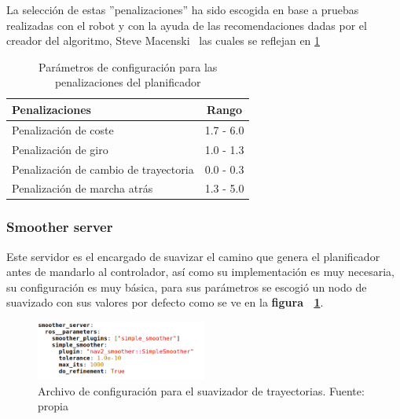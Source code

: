 La selección de estas ''penalizaciones'' ha sido escogida en base a pruebas realizadas con el robot y con la ayuda de las recomendaciones dadas 
por el creador del algoritmo, Steve Macenski~\cite{steve_mc} las cuales se reflejan en \ref{tab:parametros_planificador_steve}

\begin{table}[h!]
    \centering
    \caption{Parámetros de configuración para las penalizaciones del planificador}
    \begin{tabular}{|l|c|}
        \hline
        Penalizaciones     & Rango      \\ \hline
        Penalización de coste          & 1.7 - 6.0  \\ \hline
        Penalización de giro  & 1.0 - 1.3  \\ \hline
        Penalización de cambio de trayectoria        & 0.0 - 0.3  \\ \hline
        Penalización de marcha atrás       & 1.3 - 5.0  \\ \hline
    \end{tabular}
    \label{tab:parametros_planificador_steve}
\end{table}




\subsubsection{Smoother server}
Este servidor es el encargado de suavizar el camino que genera el planificador antes de mandarlo al controlador, así como su implementación es muy necesaria,  
su configuración es muy básica, para sus parámetros se escogió un nodo de suavizado con sus valores por defecto como se ve en la \textbf{figura ~\ref{fig:parametros_smoother_server}}.

\begin{figure}[H]
    \centering
    \includegraphics[width=0.5\textwidth]{images/smoother_configuracion.png}
    \caption{Archivo de configuración para el suavizador de trayectorias. Fuente: propia}
    \label{fig:parametros_smoother_server}
\end{figure}

